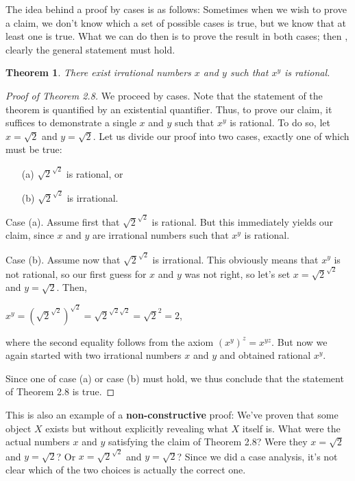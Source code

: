 \documentclass[12pt,a4paper]{article}
\newtheorem{theorem}{Theorem}[section]
\theoremstyle{definition}
\begin{document}
The idea behind a proof by cases is as follows: Sometimes when we wish to prove a claim, we don't know which a set of possible cases is true, but we know that at least one is true. What we can do then is to prove the result in both cases; then , clearly the general statement must hold.

\begin{theorem}\label{thm2.8}
There exist irrational numbers $x$ and $y$ such that $x^y$ is rational.
\end{theorem}

\begin{proof}[Proof of Theorem 2.8]
We proceed by cases. Note that the statement of the theorem is quantified by an existential quantifier. Thus, to prove our claim, it suffices to demonstrate a single $x$ and $y$ such that $x^y$ is rational. To do so, let $x=\sqrt{2}$ and $y=\sqrt{2}$. Let us divide our proof into two cases, exactly one of which must be true:
\begin{itemize}
\item[(a)] $\sqrt{2}^{\sqrt{2}}$ is rational, or
\item[(b)] $\sqrt{2}^{\sqrt{2}}$ is irrational.
\end{itemize}

Case (a). Assume first that $\sqrt{2}^{\sqrt{2}}$ is rational. But this immediately yields our claim, since $x$ and $y$ are irrational numbers such that $x^y$ is rational.

\bigbreak

Case (b). Assume now that $\sqrt{2}^{\sqrt{2}}$ is irrational. This obviously means that $x^y$ is not rational, so our first guess for $x$ and $y$ was not right, so let's set $x=\sqrt{2}^{\sqrt{2}}$ and $y=\sqrt{2}$. Then,
\begin{center}
$x^y=(\sqrt{2}^{\sqrt{2}})^{\sqrt{2}}=\sqrt{2}^{\sqrt{2}\sqrt{2}}=\sqrt{2}^2=2$,
\end{center}

where the second equality follows from the axiom $(x^y)^z=x^{yz}$. But now we again started with two irrational numbers $x$ and $y$ and obtained rational $x^y$.

\bigbreak

Since one of case (a) or case (b) must hold, we thus conclude that the statement of Theorem 2.8 is true.
\end{proof}

This is also an example of a \textbf{non-constructive} proof: We've proven that some object $X$ exists but without explicitly revealing what $X$ itself is. What were the actual numbers $x$ and $y$ satisfying the claim of Theorem 2.8? Were they $x=\sqrt{2}$ and $y=\sqrt{2}$? Or $x=\sqrt{2}^{\sqrt{2}}$ and $y=\sqrt{2}$? Since we did a case analysis, it's not clear which of the two choices is actually the correct one.
\end{document}
